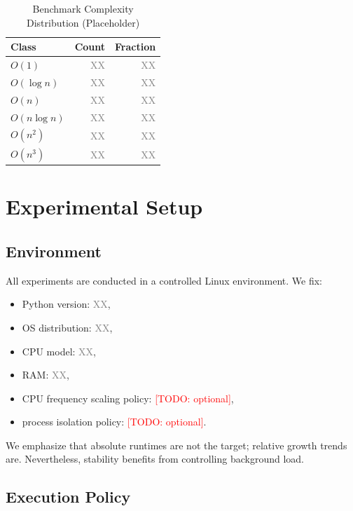 \documentclass[conference]{IEEEtran}
\newcommand{\TODO}[1]{\textcolor{red}{[TODO: #1]}}
\newcommand{\placeholder}{\textcolor{gray}{XX}}
\begin{document}
\begin{table}[t]
\centering
\caption{Benchmark Complexity Distribution (Placeholder)}
\label{tab:dist}
\begin{tabular}{lrr}
\toprule
Class & Count & Fraction \\
\midrule
$O(1)$ & \placeholder & \placeholder \\
$O(\log n)$ & \placeholder & \placeholder \\
$O(n)$ & \placeholder & \placeholder \\
$O(n\log n)$ & \placeholder & \placeholder \\
$O(n^2)$ & \placeholder & \placeholder \\
$O(n^3)$ & \placeholder & \placeholder \\
\bottomrule
\end{tabular}
\end{table}

\section{Experimental Setup}
\label{sec:setup}

\subsection{Environment}

All experiments are conducted in a controlled Linux environment.
We fix:
\begin{itemize}[leftmargin=1.2em]
\item Python version: \placeholder,
\item OS distribution: \placeholder,
\item CPU model: \placeholder,
\item RAM: \placeholder,
\item CPU frequency scaling policy: \TODO{optional},
\item process isolation policy: \TODO{optional}.
\end{itemize}

We emphasize that absolute runtimes are not the target; relative growth trends
are.
Nevertheless, stability benefits from controlling background load.

\subsection{Execution Policy}
\end{document}
